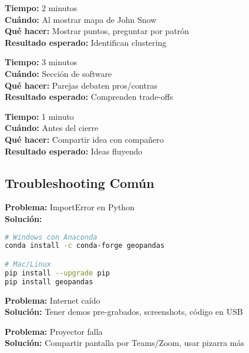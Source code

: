\documentclass[11pt,a4paper]{article}
\begin{document}
\begin{tcolorbox}[colback=blue!5,colframe=blue!50!black,title=Actividad 1: Encuentra el Patrón]
\textbf{Tiempo:} 2 minutos\\
\textbf{Cuándo:} Al mostrar mapa de John Snow\\
\textbf{Qué hacer:} Mostrar puntos, preguntar por patrón\\
\textbf{Resultado esperado:} Identifican clustering
\end{tcolorbox}

\begin{tcolorbox}[colback=green!5,colframe=green!50!black,title=Actividad 2: QGIS vs ArcGIS]
\textbf{Tiempo:} 3 minutos\\
\textbf{Cuándo:} Sección de software\\
\textbf{Qué hacer:} Parejas debaten pros/contras\\
\textbf{Resultado esperado:} Comprenden trade-offs
\end{tcolorbox}

\begin{tcolorbox}[colback=yellow!5,colframe=orange,title=Actividad 3: Idea de Proyecto]
\textbf{Tiempo:} 1 minuto\\
\textbf{Cuándo:} Antes del cierre\\
\textbf{Qué hacer:} Compartir idea con compañero\\
\textbf{Resultado esperado:} Ideas fluyendo
\end{tcolorbox}

\subsection{Troubleshooting Común}

\textbf{Problema:} ImportError en Python\\
\textbf{Solución:} 
\begin{lstlisting}[language=bash]
# Windows con Anaconda
conda install -c conda-forge geopandas

# Mac/Linux
pip install --upgrade pip
pip install geopandas
\end{lstlisting}

\textbf{Problema:} Internet caído\\
\textbf{Solución:} Tener demos pre-grabados, screenshots, código en USB

\textbf{Problema:} Proyector falla\\
\textbf{Solución:} Compartir pantalla por Teams/Zoom, usar pizarra más
\end{document}
